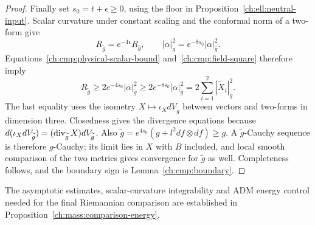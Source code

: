 \begin{proof}
Finally set $s_0=t+\epsilon\ge0$, using the floor in
Proposition~\ref{ch:ell:neutral-input}. Scalar curvature under constant scaling and the conformal norm
of a two-form give
\[
 R_{\widetilde g}=e^{-4\epsilon}R_{\hat g},\qquad
 |\alpha|_{\widetilde g}^2=e^{-8s_0}|\alpha|_{\bar g}^2.
\]
Equations~\eqref{ch:cmp:physical-scalar-bound} and~\eqref{ch:cmp:field-square}
therefore imply
\[
 R_{\widetilde g}\ge2e^{-4s_0}|\alpha|_{\bar g}^2
       \ge2e^{-8s_0}|\alpha|_{\bar g}^2
       =2\sum_{i=1}^2|\widetilde X_i|_{\widetilde g}^2.
\]
The last equality uses the isometry
$X\mapsto\iota_XdV_{\widetilde g}$ between vectors and two-forms in
dimension three.  Closedness gives the divergence equations because
$d(\iota_XdV_{\widetilde g})=(\operatorname{div}_{\widetilde g}X)dV_{\widetilde g}$.
Also $\widetilde g=e^{4s_0}(g+l^2df\otimes df)\ge g$.
A $\widetilde g$-Cauchy sequence is therefore $g$-Cauchy; its limit lies in
$X$ with $B$ included, and local smooth comparison of the two metrics
gives convergence for $\widetilde g$ as well.  Completeness follows, and
the boundary sign is Lemma~\ref{ch:cmp:boundary}.
\end{proof}

The asymptotic estimates, scalar-curvature integrability and ADM energy
control needed for the final Riemannian comparison are established in
Proposition~\ref{ch:mass:comparison-energy}.
